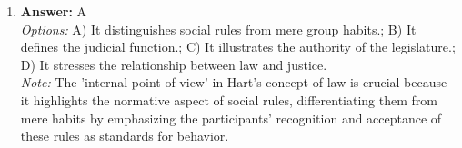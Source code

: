 \documentclass[12pt]{article}
\begin{document}
\begin{enumerate}[label=\arabic*.]
\\ \textit{Options:} A) Prior screening by neutral fact finder; B) Prior screening, notice and opportunity to respond; C) Prior notice and prior evidentiary hearing; D) Prior notice and immediate termination; E) Immediate termination without notice
\\ \textit{Note:} The correct answer is based on the principle of due process, which mandates that individuals must receive prior notice and have the opportunity for a hearing before the state can terminate parental custody rights or welfare benefits, ensuring fair treatment under the law.
\item \textbf{Answer:} A
\\ \textit{Options:} A) It distinguishes social rules from mere group habits.; B) It defines the judicial function.; C) It illustrates the authority of the legislature.; D) It stresses the relationship between law and justice.
\\ \textit{Note:} The 'internal point of view' in Hart's concept of law is crucial because it highlights the normative aspect of social rules, differentiating them from mere habits by emphasizing the participants' recognition and acceptance of these rules as standards for behavior.
\end{enumerate}
\end{document}
